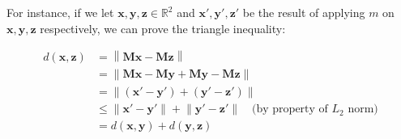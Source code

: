 \documentclass{article}
\newcommand{\vect}[1]{\ensuremath{\boldsymbol{\mathbf{#1}}}\xspace}
\begin{document}
For instance, if we let $\vect{x},\vect{y},\vect{z} \in \mathbb{R}^2$ and $\vect{x'},\vect{y'},\vect{z'}$ be the result of applying $m$ on $\vect{x},\vect{y},\vect{z}$ respectively, we can prove the triangle inequality:

\begin{align}
\nonumber d(\vect{x},\vect{z}) &= \left\|\vect{M}\vect{x} - \vect{M}\vect{z}\right\|\\
\nonumber &= \left\|\vect{M}\vect{x} - \vect{M}\vect{y} + \vect{M}\vect{y} - \vect{M}\vect{z}\right\|\\
\nonumber &= \left\|(\vect{x'} - \vect{y'}) + (\vect{y'} - \vect{z'})\right\|\\
\nonumber &\leq \left\|\vect{x'} - \vect{y'}\right\| + \left\|\vect{y'} - \vect{z'}\right\|\quad \text{(by property of } L_2 \text{ norm)}\\
  &= d(\vect{x},\vect{y}) + d(\vect{y},\vect{z})
\end{align}


\end{document}
